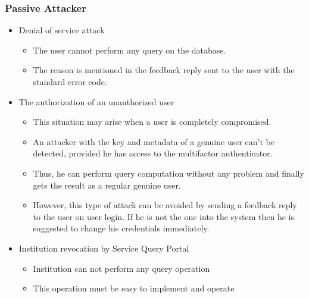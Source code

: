 \subsubsection{Passive Attacker}
\begin{itemize}
    \item Denial of service attack
          \begin{itemize}
              \item The user cannot perform any query on the database.
              \item The reason is mentioned in the feedback reply sent to the user with the standard error code.
          \end{itemize}
    \item The authorization of an unauthorized user
          \begin{itemize}
              \item This situation may arise when a user is completely compromised.
              \item An attacker with the key and metadata of a genuine user can’t be detected, provided he has access to the multifactor authenticator.
              \item Thus, he can perform query computation without any problem and finally gets the result as a regular genuine user.
              \item However, this type of attack can be avoided by sending a feedback reply to the user on user login. If he is not the one into the system then he is suggested to change his credentials immediately.
          \end{itemize}

    \item Institution revocation by Service Query Portal
          \begin{itemize}
              \item Institution can not perform any query operation
              \item This operation must be easy to implement and operate
          \end{itemize}

\end{itemize}

